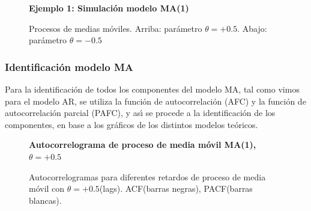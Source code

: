 \begin{figure}[h]
	\centering
	\textbf{Ejemplo 1: Simulaci\'on modelo MA(1)}\par\medskip
	\caption{Procesos de medias móviles. Arriba: parámetro $\theta=+0.5$. Abajo: parámetro $\theta=-0.5$}\label{fig9}
\end{figure}


\pagebreak
\subsubsection{Identificaci\'on modelo MA }
Para la identificaci\'on de todos los componentes del modelo MA, tal como vimos para el modelo AR, se utiliza la funci\'on de autocorrelaci\'on (AFC) y la funci\'on de autocorrelaci\'on parcial (PAFC), y as\'{\i} se procede a la identificaci\'on de los componentes, en base a los gr\'aficos de los distintos modelos te\'oricos.

\begin{figure}[h]
	\centering
	\textbf{Autocorrelograma de proceso de media móvil MA(1), $\theta=+0.5$}\par\medskip
	\caption{Autocorrelogramas para diferentes retardos de proceso de media móvil con $\theta=+0.5$(lags). ACF(barras negras), PACF(barras blancas).}\label{fig10}
\end{figure}



